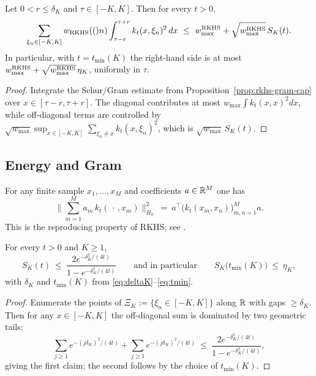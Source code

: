 \begin{lemma}\label{rkhs:lem:shift-window}
Let $0<r\le\delta_K$ and $\tau\in[-K,K]$. Then for every $t>0$,
\[
  \sum_{\xi_n\in[-K,K]} w_{\mathrm{RKHS}}(()n)\int_{\tau-r}^{\tau+r} k_t(x,\xi_n)^2\,dx
  \ \le\ w_{\max}^{\mathrm{RKHS}}+\sqrt{w_{\max}^{\mathrm{RKHS}}}\,S_K(t).
\]
In particular, with $t=t_{\min}(K)$ the right-hand side is at most $w_{\max}^{\mathrm{RKHS}}+\sqrt{w_{\max}^{\mathrm{RKHS}}}\,\eta_K$, uniformly in $\tau$.
\end{lemma}

\begin{proof}
Integrate the Schur/Gram estimate from Proposition~\ref{prop:rkhs-gram-cap} over $x\in[\tau-r,\tau+r]$.
The diagonal contributes at most $w_{\max}\int k_t(x,x)^2 dx$, while off-diagonal terms are controlled by
$\sqrt{w_{\max}}\sup_{x\in[-K,K]}\sum_{\xi_n\neq x} k_t(x,\xi_n)^2$, which is $\sqrt{w_{\max}}\,S_K(t)$.
\end{proof}

\subsection*{Energy and Gram}

\begin{lemma}\label{lem:rkhs-energy-primecap}
For any finite sample $x_1,\dots,x_M$ and coefficients $a\in\mathbb R^M$ one has
\[
\Big\|\sum_{m=1}^M a_m\,k_t(\,\cdot\,,x_m)\Big\|_{H_k}^2
\ =\ a^\top \Big(k_t(x_m,x_n)\Big)_{m,n=1}^M a.
\]
This is the reproducing property of RKHS; see \cite{Aronszajn1950}.
\end{lemma}

\begin{lemma}\label{lem:rkhs-gram-off}
For every $t>0$ and $K\ge1$,
\[
S_K(t)\ \le\ \frac{2e^{-\delta_K^2/(4t)}}{1-e^{-\delta_K^2/(4t)}}
\qquad\text{and in particular}\qquad
S_K\big(t_{\min}(K)\big)\ \le\ \eta_K,
\]
with $\delta_K$ and $t_{\min}(K)$ from \eqref{eq:deltaK}--\eqref{eq:tmin}.
\end{lemma}

\begin{proof}
Enumerate the points of $\Xi_K:=\{\xi_n\in[-K,K]\}$ along $\mathbb R$ with gaps $\ge\delta_K$.
Then for any $x\in[-K,K]$ the off-diagonal sum is dominated by two geometric tails:
\[
\sum_{j\ge1} e^{-(j\delta_K)^2/(4t)}+\sum_{j\ge1} e^{-(j\delta_K)^2/(4t)}
\ \le\ \frac{2e^{-\delta_K^2/(4t)}}{1-e^{-\delta_K^2/(4t)}},
\]
giving the first claim; the second follows by the choice of $t_{\min}(K)$.
\end{proof}

